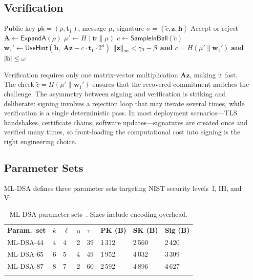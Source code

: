 \subsection{Verification}
\label{subsec:ml-dsa-verify}

\begin{algorithm}[t]
\caption{ML-DSA $\Verify$}
\label{alg:ml-dsa-verify}
\begin{algorithmic}[1]
\Require Public key $\mathsf{pk} = (\rho, \mathbf{t}_1)$, message $\mu$, signature $\sigma = (\tilde{c}, \mathbf{z}, \mathbf{h})$
\Ensure Accept or reject
\State $\mathbf{A} \gets \mathsf{ExpandA}(\rho)$
\State $\mu' \gets H(\mathsf{tr} \| \mu)$
\State $c \gets \mathsf{SampleInBall}(\tilde{c})$
\State $\mathbf{w}_1' \gets \mathsf{UseHint}(\mathbf{h},\; \mathbf{A}\mathbf{z} - c \cdot \mathbf{t}_1 \cdot 2^d)$ 
\State \Return $\left\lVert \mathbf{z} \right\rVert_\infty < \gamma_1 - \beta$ \textbf{and} $\tilde{c} = H(\mu' \| \mathbf{w}_1')$ \textbf{and} $\left\lvert \mathbf{h} \right\rvert \leq \omega$
\end{algorithmic}
\end{algorithm}

Verification requires only one matrix-vector multiplication $\mathbf{A}\mathbf{z}$, making it fast.  The check $\tilde{c} = H(\mu' \| \mathbf{w}_1')$ ensures that the recovered commitment matches the challenge.  The asymmetry between signing and verification is striking and deliberate: signing involves a rejection loop that may iterate several times, while verification is a single deterministic pass.  In most deployment scenarios---TLS handshakes, certificate chains, software updates---signatures are created once and verified many times, so front-loading the computational cost into signing is the right engineering choice.

\subsection{Parameter Sets}
\label{subsec:ml-dsa-params}

ML-DSA defines three parameter sets targeting NIST security levels~I, III, and V:

\begin{table}[t]
\caption{ML-DSA parameter sets~\cite{FIPS204}.  Sizes include encoding overhead.}
\label{tab:ml-dsa-params}
\begin{tabular}{p{2cm}p{1cm}p{1cm}p{1cm}p{1cm}p{1.5cm}p{1.5cm}p{1.5cm}}
\hline\noalign{\smallskip}
\textbf{Param.\ set} & $k$ & $\ell$ & $\eta$ & $\tau$ & \textbf{PK (B)} & \textbf{SK (B)} & \textbf{Sig (B)} \\
\noalign{\smallskip}\svhline\noalign{\smallskip}
ML-DSA-44 & 4 & 4 & 2 & 39 & 1\,312 & 2\,560 & 2\,420 \\
ML-DSA-65 & 6 & 5 & 4 & 49 & 1\,952 & 4\,032 & 3\,309 \\
ML-DSA-87 & 8 & 7 & 2 & 60 & 2\,592 & 4\,896 & 4\,627 \\
\noalign{\smallskip}\hline
\end{tabular}
\end{table}

